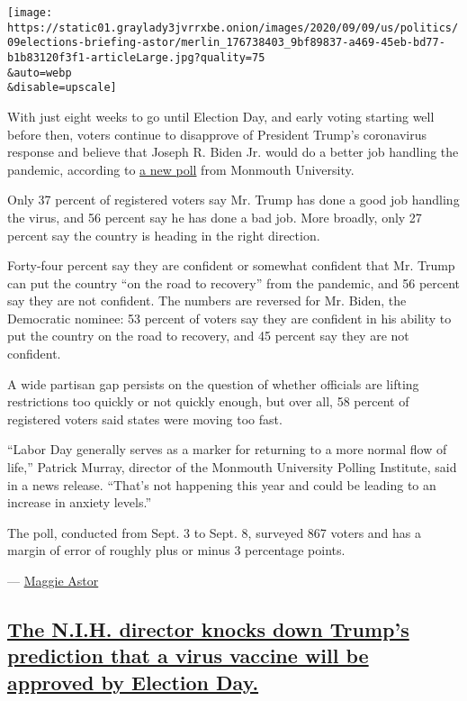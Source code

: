 \texttt{[image: https://static01.graylady3jvrrxbe.onion/images/2020/09/09/us/politics/09elections-briefing-astor/merlin\_176738403\_9bf89837-a469-45eb-bd77-b1b83120f3f1-articleLarge.jpg?quality=75\\\&auto=webp\\\&disable=upscale]}

With just eight weeks to go until Election Day, and early voting
starting well before then, voters continue to disapprove of President
Trump's coronavirus response and believe that Joseph R. Biden Jr. would
do a better job handling the pandemic, according to
\href{https://www.monmouth.edu/polling-institute/reports/monmouthpoll_US_090920/}{a
new poll} from Monmouth University.

Only 37 percent of registered voters say Mr. Trump has done a good job
handling the virus, and 56 percent say he has done a bad job. More
broadly, only 27 percent say the country is heading in the right
direction.

Forty-four percent say they are confident or somewhat confident that Mr.
Trump can put the country ``on the road to recovery'' from the pandemic,
and 56 percent say they are not confident. The numbers are reversed for
Mr. Biden, the Democratic nominee: 53 percent of voters say they are
confident in his ability to put the country on the road to recovery, and
45 percent say they are not confident.

A wide partisan gap persists on the question of whether officials are
lifting restrictions too quickly or not quickly enough, but over all, 58
percent of registered voters said states were moving too fast.

``Labor Day generally serves as a marker for returning to a more normal
flow of life,'' Patrick Murray, director of the Monmouth University
Polling Institute, said in a news release. ``That's not happening this
year and could be leading to an increase in anxiety levels.''

The poll, conducted from Sept. 3 to Sept. 8, surveyed 867 voters and has
a margin of error of roughly plus or minus 3 percentage points.

--- \href{https://www.nytimes3xbfgragh.onion/by/maggie-astor}{Maggie
Astor}

\hypertarget{the-nih-director-knocks-down-trumps-prediction-that-a-virus-vaccine-will-be-approved-by-election-day}{%
\subsection{\texorpdfstring{\protect\hyperlink{the-nih-director-knocks-down-trumps-prediction-that-a-virus-vaccine-will-be-approved-by-election-day}{The
N.I.H. director knocks down Trump's prediction that a virus vaccine will
be approved by Election
Day.}}{The N.I.H. director knocks down Trump's prediction that a virus vaccine will be approved by Election Day.}}\label{the-nih-director-knocks-down-trumps-prediction-that-a-virus-vaccine-will-be-approved-by-election-day}}

